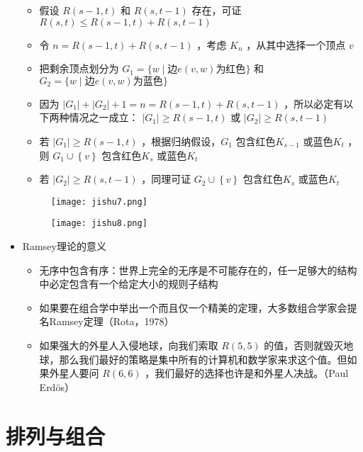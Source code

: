 \documentclass[UTF8]{report}
\theoremstyle{MyLineTheoremStyle} %
\theoremstyle{MyBlockTheoremStyle} %
\theoremstyle{MySubsubsectionStyle} %
\begin{document}
\begin{itemize}
\begin{itemize}
        \item 假设 $R(s - 1,t)$ 和 $R(s,t - 1)$ 存在，可证 $R(s,t) \leq R(s - 1,t) + R(s,t - 1)$
        \item 令 $n = R(s - 1,t) + R(s,t - 1)$ ，考虑 $K_n$ ，从其中选择一个顶点 $v$
        \item 把剩余顶点划分为 $G_1 = \{w \mid \text{边}e(v, w) \text{为红色}\}$ 和 $G_2 = \{w \mid \text{边}e(v, w) \text{为蓝色}\}$
        \item 因为 $|G_1| + |G_2| + 1 = n = R(s - 1,t) + R(s,t - 1)$ ，所以必定有以下两种情况之一成立： $|G_1| \geq R(s - 1,t)$ 或 $|G_2| \geq R(s,t - 1)$
        \item 若 $|G_1| \geq R(s - 1,t)$ ，根据归纳假设，$G_1$ 包含红色$K_{s-1}$ 或蓝色$K_t$ ，则 $G_1 \cup \left\{v \right\}$ 包含红色$K_s$ 或蓝色$K_t$
        \item 若 $|G_2| \geq R(s,t - 1)$ ，同理可证 $G_2 \cup \left\{v\right\}$ 包含红色$K_s$ 或蓝色$K_t$
    \end{itemize}
    \begin{figure}[H]
        \centering
        \texttt{[image: jishu7.png]}
    \end{figure}

    \begin{figure}[H]
        \centering
        \texttt{[image: jishu8.png]}
    \end{figure}
    \item Ramsey理论的意义
    \begin{itemize}
        \item 无序中包含有序：世界上完全的无序是不可能存在的，任一足够大的结构中必定包含有一个给定大小的规则子结构
        \item 如果要在组合学中举出一个而且仅一个精美的定理，大多数组合学家会提名Ramsey定理（Rota，1978）
        \item 如果强大的外星人入侵地球，向我们索取 $R(5,5)$ 的值，否则就毁灭地球，那么我们最好的策略是集中所有的计算机和数学家来求这个值。但如果外星人要问 $R(6,6)$ ，我们最好的选择也许是和外星人决战。（Paul Erdös）
    \end{itemize}
\end{itemize}

\section{排列与组合}
\end{document}
